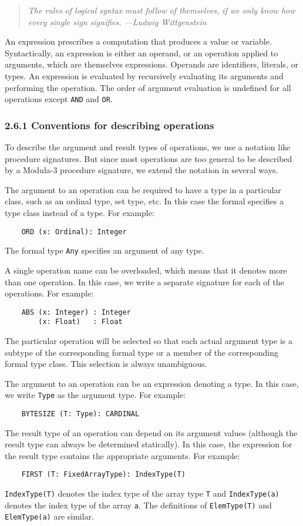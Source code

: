 \documentclass[10pt]{article}
\begin{document}
\begin{quote}
  \emph{The rules of logical syntax must follow of themselves, if we only
    know how every single sign signifies.  ---Ludwig Wittgenstein}
\end{quote}

An expression prescribes a computation that produces a value or variable.
Syntactically, an expression is either an operand, or an operation applied to
arguments, which are themselves expressions.  Operands are identifiers,
literals, or types.  An expression is evaluated by recursively evaluating its
arguments and performing the operation.  The order of argument evaluation is
undefined for all operations except \verb|AND| and \verb|OR|.

\subsubsection*{2.6.1 Conventions for describing operations}

To describe the argument and result types of operations, we use a notation
like procedure signatures.  But since most operations are too general to be
described by a Modula-3 procedure signature, we extend the notation in several
ways.

The argument to an operation can be required to have a type in a particular
class, such as an ordinal type, set type, etc.  In this case the formal
specifies a type class instead of a type.  For example:
\begin{verbatim}
    ORD (x: Ordinal): Integer
\end{verbatim}
The formal type \verb|Any| specifies an argument of any type.

A single operation name can be overloaded, which means that it denotes more
than one operation.  In this case, we write a separate signature for each of
the operations.  For example:
\begin{verbatim}
    ABS (x: Integer) : Integer
        (x: Float)   : Float
\end{verbatim}
The particular operation will be selected so that each actual argument type is
a subtype of the corresponding formal type or a member of the corresponding
formal type class.  This selection is always unambiguous. 

The argument to an operation can be an expression denoting a type.  In this
case, we write \verb|Type| as the argument type.  For example:
\begin{verbatim}
    BYTESIZE (T: Type): CARDINAL
\end{verbatim}
The result type of an operation can depend on its argument values (although
the result type can always be determined statically).  In this case, the
expression for the result type contains the appropriate arguments.  For
example:
\begin{verbatim}
    FIRST (T: FixedArrayType): IndexType(T)
\end{verbatim}
\verb|IndexType(T)| denotes the index type of the array type \verb|T| and
\verb|IndexType(a)| denotes the index type of the array \verb|a|.  The
definitions of \verb|ElemType(T)| and \verb|ElemType(a)| are similar.
\end{document}
